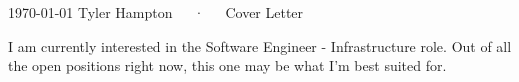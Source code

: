 \documentclass[11pt, a4paper]{awesome-cv}
\begin{document}
\makecvheader[R]

\makecvfooter
{\today}
{Tyler Hampton~~~·~~~Cover Letter}
{}

\makelettertitle

\begin{cvletter}


	I am currently interested in the Software Engineer - Infrastructure role. Out of all the open positions right now, this one may be what I'm best suited for.

\end{cvletter}


\makeletterclosing
\end{document}
